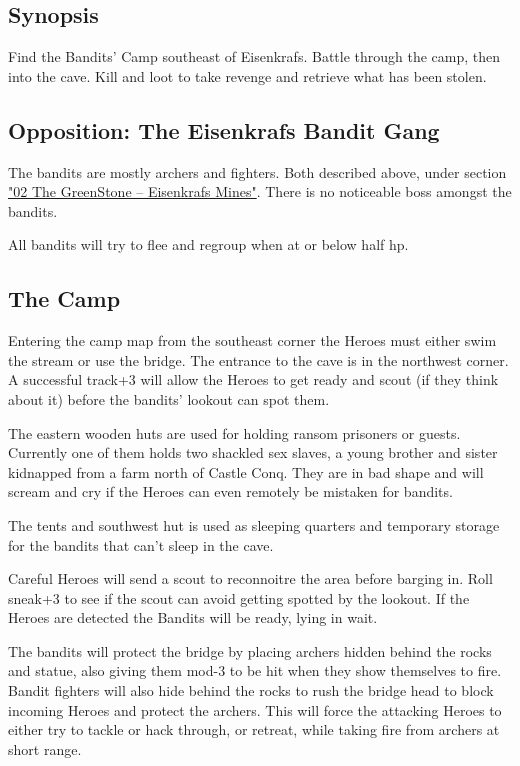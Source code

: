 \subsection*{Synopsis}
Find the Bandits' Camp southeast of Eisenkrafs. Battle through the camp, then into the cave. Kill and loot to take revenge and retrieve what has been stolen.


\subsection*{Opposition: The Eisenkrafs Bandit Gang}
The bandits are mostly archers and fighters. Both described above, under section \hyperref[sec:02GreenStone]{"02 The GreenStone -- Eisenkrafs Mines"}. There is no noticeable boss amongst the bandits.

All bandits will try to flee and regroup when at or below half hp.


\subsection*{The Camp}
Entering the camp map from the southeast corner the Heroes must either swim the stream or use the bridge. The entrance to the cave is in the northwest corner. A successful track+3 will allow the Heroes to get ready and scout (if they think about it) before the bandits' lookout can spot them.

The eastern wooden huts are used for holding ransom prisoners or guests. Currently one of them holds two shackled sex slaves, a young brother and sister kidnapped from a farm north of Castle Conq. They are in bad shape and will scream and cry if the Heroes can even remotely be mistaken for bandits.

The tents and southwest hut is used as sleeping quarters and temporary storage for the bandits that can't sleep in the cave.

Careful Heroes will send a scout to reconnoitre the area before barging in. Roll sneak+3 to see if the scout can avoid getting spotted by the lookout. If the Heroes are detected the Bandits will be ready, lying in wait.

The bandits will protect the bridge by placing archers hidden behind the rocks and statue, also giving them mod-3 to be hit when they show themselves to fire. Bandit fighters will also hide behind the rocks to rush the bridge head to block incoming Heroes and protect the archers. This will force the attacking Heroes to either try to tackle or hack through, or retreat, while taking fire from archers at short range.


